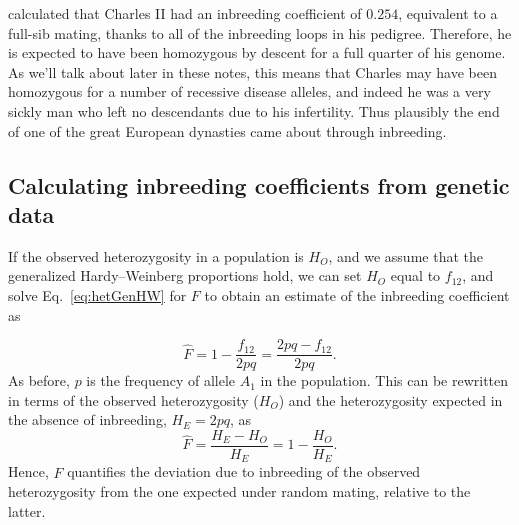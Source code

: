 \citet{alvarez:09} calculated that Charles II had an inbreeding
coefficient of $0.254$, equivalent to a full-sib mating,
thanks to all of the inbreeding loops in his pedigree. Therefore, he
is expected to have been homozygous by descent for a full quarter of his
genome. As we'll talk about later in these notes, this means that Charles
may have been homozygous for a number of recessive disease alleles,
and indeed he was a very sickly man who left no descendants due to his
infertility.  Thus plausibly the end of one of the great
European dynasties came about through inbreeding. 


\subsection{Calculating inbreeding coefficients from genetic data}


If the observed heterozygosity in a population is $H_O$, and we assume that the
generalized Hardy--Weinberg proportions hold, we can set $H_O$ equal to
$f_{12}$, and solve Eq.\ \eqref{eq:hetGenHW} for $F$ to obtain an estimate of
the inbreeding coefficient as

\begin{equation}
\hat{F} = 1-\frac{f_{12}}{2pq} = \frac{2pq - f_{12}}{2pq}.
\label{eqn:Fhat}
\end{equation}
As before, $p$ is the frequency of allele $A_{1}$ in the population. This can
be rewritten in terms of the observed heterozygosity ($H_O$) and the
heterozygosity expected in the absence of inbreeding, $H_E=2pq$, as
\begin{equation}
\hat{F} = \frac{H_E-H_O}{H_E} = 1 - \frac{H_O}{H_E}.
\label{eqn:FhatHO}
\end{equation}
Hence, $\hat{F}$ quantifies the deviation due to inbreeding of the observed heterozygosity from the one expected under random mating, relative to the latter.

